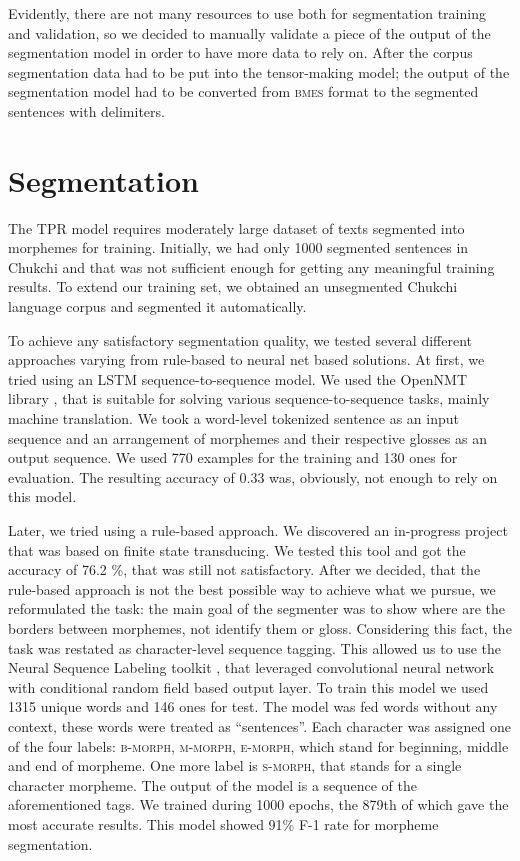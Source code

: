 \documentclass[leqno]{article}
\begin{document}
Evidently, there are not many resources to use both for segmentation training and validation, so we decided to manually validate a piece of the output of the segmentation model in order to have more data to rely on. 
After the corpus segmentation data had to be put into the tensor-making model; the output of the segmentation model had to be converted from \textsc{bmes} format to the segmented sentences with delimiters.


\section{Segmentation}
The TPR model requires moderately large dataset of texts segmented into morphemes for training. Initially, we had only 1000 segmented sentences in Chukchi and that was not sufficient enough for getting any meaningful training results. To extend our training set, we obtained an unsegmented Chukchi language corpus and segmented it automatically.

To achieve any satisfactory segmentation quality, we tested several different approaches varying from rule-based to neural net based solutions. At first, we tried using an LSTM sequence-to-sequence model. We used the OpenNMT library \parencite{klein-etal-2017-opennmt}, that is suitable for solving various sequence-to-sequence tasks, mainly machine translation. We took a word-level tokenized sentence as an input sequence and an arrangement of morphemes and their respective glosses as an output sequence. We used  770 examples for the training and 130 ones for evaluation. The resulting accuracy of 0.33 was, obviously, not enough to rely on this model.

Later, we tried using a rule-based approach. We discovered an in-progress project \parencite{chkchn} that was based on finite state transducing. We tested this tool and got the accuracy of 76.2 \%, that was still not satisfactory. After we decided, that the rule-based approach is not the best possible way to achieve what we pursue, we reformulated the task: the main goal of the segmenter was to show where are the borders between morphemes, not identify them or gloss. Considering this fact, the task was restated as character-level sequence tagging. This allowed us to use the Neural Sequence Labeling toolkit \parencite{yang2018ncrf}, that leveraged convolutional neural network with conditional random field based output layer. To train this model we used 1315 unique words and 146 ones for test. The model was fed words without any context, these words were treated as “sentences”. Each character was assigned one of the four labels: \textsc{b-morph}, \textsc{m-morph}, \textsc{e-morph}, which stand for beginning, middle and end of morpheme. One more label is \textsc{s-morph}, that stands for a single character morpheme. The output of the model is a sequence of the aforementioned tags. We trained during 1000 epochs, the 879th of which gave the most accurate results. This model showed  91\% F-1 rate for morpheme segmentation.
\end{document}
